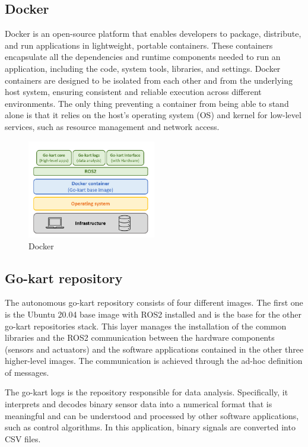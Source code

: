 \documentclass[a4paper,12pt,oneside]{book}
\begin{document}
\subsection*{Docker}
Docker is an open-source platform that enables developers to package, distribute, and run applications in lightweight, portable containers. 
These containers encapsulate all the dependencies and runtime components needed to run an application, including the code, system tools, libraries, and settings.
Docker containers are designed to be isolated from each other and from the underlying host system, ensuring consistent and reliable execution across different environments.
The only thing preventing a container from being able to stand alone is that it relies on the host’s operating system (OS) and kernel for low-level services, such as resource management and network access.
\begin{figure}
	\centering
	\includegraphics[width=0.5\textwidth]{Docker.png}
	\caption{Docker}
	\label{image:Docker}
\end{figure}

\subsection*{Go-kart repository}
The autonomous go-kart repository consists of four different images. 
The first one is the Ubuntu 20.04 base image with ROS2 installed and is the base for the other go-kart repositories stack.
This layer manages the installation of the common libraries and the ROS2 communication between the hardware components (sensors and actuators) and the software applications contained in the other three higher-level images. 
The communication is achieved through the ad-hoc definition of messages.

The go-kart logs is the repository responsible for data analysis. 
Specifically, it interprets and decodes binary sensor data into a numerical format that is meaningful and can be understood and processed by other software applications, such as control algorithms.
In this application, binary signals are converted into CSV files.
\end{document}
